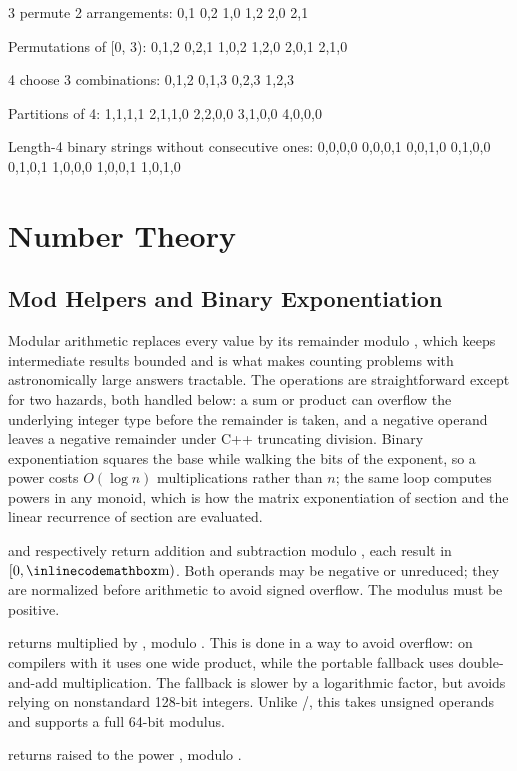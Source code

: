 \begin{exampleoutput}
3 permute 2 arrangements:
{0,1} {0,2} {1,0} {1,2} {2,0} {2,1}

Permutations of [0, 3):
{0,1,2} {0,2,1} {1,0,2} {1,2,0} {2,0,1} {2,1,0}

4 choose 3 combinations:
{0,1,2} {0,1,3} {0,2,3} {1,2,3}

Partitions of 4:
{1,1,1,1} {2,1,1,0} {2,2,0,0} {3,1,0,0} {4,0,0,0}

Length-4 binary strings without consecutive ones:
{0,0,0,0} {0,0,0,1} {0,0,1,0} {0,1,0,0} {0,1,0,1} {1,0,0,0} {1,0,0,1} {1,0,1,0}
\end{exampleoutput}

\section{\texorpdfstring{Number Theory}{6.3 Number Theory}}
\setcounter{section}{3}
\setcounter{subsection}{0}
\subsection{Mod Helpers and Binary Exponentiation}
\label{sec:6.3.1}
Modular arithmetic replaces every value by its remainder modulo , which keeps intermediate results bounded and is what makes counting problems with astronomically large answers tractable. The operations are straightforward except for two hazards, both handled below: a sum or product can overflow the underlying integer type before the remainder is taken, and a negative operand leaves a negative remainder under C++ truncating division. Binary exponentiation squares the base while walking the bits of the exponent, so a power costs $O(\log n)$ multiplications rather than $n$; the same loop computes powers in any monoid, which is how the matrix exponentiation of section  and the linear recurrence of section  are evaluated.

\begin{compactitem}
  \item {} and  respectively return addition and subtraction modulo , each result in $[0, {\inlinecodemath{m}})$. Both operands may be negative or unreduced; they are normalized before arithmetic to avoid signed overflow. The modulus  must be positive.
  \item {} returns  multiplied by , modulo . This is done in a way to avoid overflow: on compilers with  it uses one wide product, while the portable fallback uses double-and-add multiplication. The fallback is slower by a logarithmic factor, but avoids relying on nonstandard 128-bit integers. Unlike /, this takes unsigned operands and supports a full 64-bit modulus.
  \item {} returns  raised to the power , modulo .
\end{compactitem}

